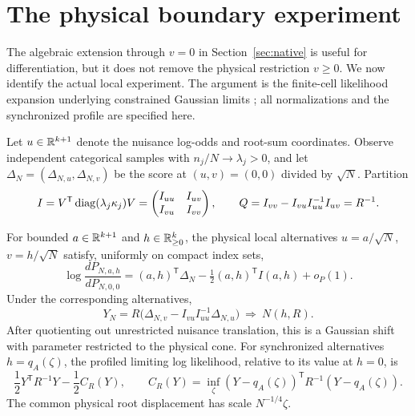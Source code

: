 \section{The physical boundary experiment}\label{sec:boundary}
The algebraic extension through $v=0$ in Section~\ref{sec:native} is useful for differentiation, but it does not remove the physical restriction $v\ge0$. We now identify the actual local experiment. The argument is the finite-cell likelihood expansion underlying constrained Gaussian limits \cite{Geyer,vdV}; all normalizations and the synchronized profile are specified here.

Let $u\in\mathbb R^{k+1}$ denote the nuisance log-odds and root-sum coordinates. Observe independent categorical samples with $n_j/N\to\lambda_j>0$, and let $\Delta_N=(\Delta_{N,u},\Delta_{N,v})$ be the score at $(u,v)=(0,0)$ divided by $\sqrt N$. Partition
\[
 I=V^{\mathsf T}\operatorname{diag}(\lambda_j\kappa_j)V
   =\begin{pmatrix}I_{uu}&I_{uv}\\I_{vu}&I_{vv}\end{pmatrix},
 \qquad Q=I_{vv}-I_{vu}I_{uu}^{-1}I_{uv}=R^{-1}.
\]
\begin{theorem}\label{thm:boundary}
For bounded $a\in\mathbb R^{k+1}$ and $h\in\mathbb R^k_{\ge0}$, the physical local alternatives $u=a/\sqrt N$, $v=h/\sqrt N$ satisfy, uniformly on compact index sets,
\begin{equation}\label{eq:LAN}
 \log\frac{dP_{N,a,h}}{dP_{N,0,0}}
  =(a,h)^{\mathsf T}\Delta_N-\tfrac12(a,h)^{\mathsf T}I(a,h)+o_P(1).
\end{equation}
Under the corresponding alternatives,
\begin{equation}\label{eq:efficient-Y}
 Y_N=R\bigl(\Delta_{N,v}-I_{vu}I_{uu}^{-1}\Delta_{N,u}\bigr)
          \ \Longrightarrow\ N(h,R).
\end{equation}
After quotienting out unrestricted nuisance translation, this is a Gaussian shift with parameter restricted to the physical cone. For synchronized alternatives $h=q_A(\zeta)$, the profiled limiting log likelihood, relative to its value at $h=0$, is
\begin{equation}\label{eq:profile-limit}
 \frac12Y^{\mathsf T}R^{-1}Y-\frac12C_R(Y),\qquad
 C_R(Y)=\inf_\zeta(Y-q_A(\zeta))^{\mathsf T}R^{-1}(Y-q_A(\zeta)).
\end{equation}
The common physical root displacement has scale $N^{-1/4}\zeta$.
\end{theorem}
